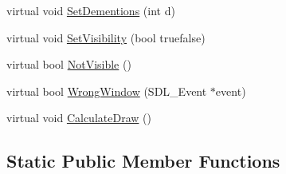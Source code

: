 \begin{DoxyCompactItemize}
\item 
virtual void \hyperlink{class_d_k_object_a666c2d284d27464bae10e85d7bfb731a}{Set\-Dementions} (int d)
\item 
virtual void \hyperlink{class_d_k_object_ac0e68a11a0023769846b2e50c6d05509}{Set\-Visibility} (bool truefalse)
\item 
virtual bool \hyperlink{class_d_k_object_a303931c4a0dd5278356d324b20e82b87}{Not\-Visible} ()
\item 
virtual bool \hyperlink{class_d_k_object_a89f29ee1ed512e87ed2ab15d27056b75}{Wrong\-Window} (S\-D\-L\-\_\-\-Event $\ast$event)
\item 
virtual void \hyperlink{class_d_k_object_ad66b33364278cb031d6c8be9b7dff8d2}{Calculate\-Draw} ()
\end{DoxyCompactItemize}
\subsection*{Static Public Member Functions}
